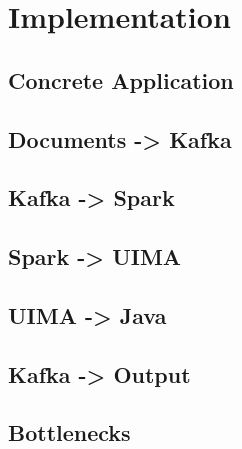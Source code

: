 \chapter{Implementation}

\section{Concrete Application}

\section{Documents -> Kafka}

\section{Kafka -> Spark}

\section{Spark -> UIMA}

\section{UIMA -> Java}

\section{Kafka -> Output}

\section{Bottlenecks}
